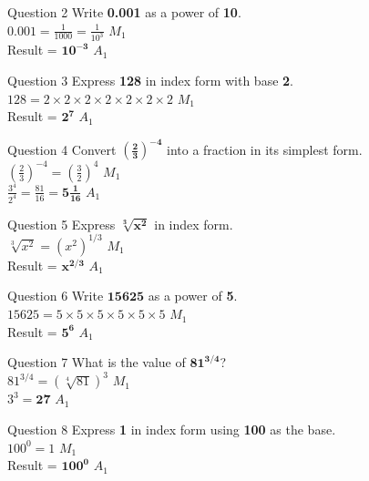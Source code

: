 \documentclass[12pt, a4paper, oneside]{article}
\begin{document}
\begin{solvingbox}{Question 2}
Write \textbf{0.001} as a power of \textbf{10}. \\
$0.001 = \frac{1}{1000} = \frac{1}{10^3}$ \hfill $M_1$ \\
Result = $\mathbf{10^{-3}}$ \hfill $A_1$
\end{solvingbox}

\begin{solvingbox}{Question 3}
Express \textbf{128} in index form with base \textbf{2}. \\
$128 = 2 \times 2 \times 2 \times 2 \times 2 \times 2 \times 2$ \hfill $M_1$ \\
Result = $\mathbf{2^7}$ \hfill $A_1$
\end{solvingbox}

\begin{solvingbox}{Question 4}
Convert $\mathbf{(\frac{2}{3})^{-4}}$ into a fraction in its simplest form. \\
$(\frac{2}{3})^{-4} = (\frac{3}{2})^4$ \hfill $M_1$ \\
$\frac{3^4}{2^4} = \frac{81}{16} = \mathbf{5\frac{1}{16}}$ \hfill $A_1$
\end{solvingbox}

\begin{solvingbox}{Question 5}
Express $\mathbf{\sqrt[3]{x^2}}$ in index form. \\
$\sqrt[3]{x^2} = (x^2)^{1/3}$ \hfill $M_1$ \\
Result = $\mathbf{x^{2/3}}$ \hfill $A_1$
\end{solvingbox}

\begin{solvingbox}{Question 6}
Write $\mathbf{15625}$ as a power of \textbf{5}. \\
$15625 = 5 \times 5 \times 5 \times 5 \times 5 \times 5$ \hfill $M_1$ \\
Result = $\mathbf{5^6}$ \hfill $A_1$
\end{solvingbox}

\begin{solvingbox}{Question 7}
What is the value of $\mathbf{81^{3/4}}$? \\
$81^{3/4} = (\sqrt[4]{81})^3$ \hfill $M_1$ \\
$3^3 = \mathbf{27}$ \hfill $A_1$
\end{solvingbox}

\begin{solvingbox}{Question 8}
Express \textbf{1} in index form using \textbf{100} as the base. \\
$100^0 = 1$ \hfill $M_1$ \\
Result = $\mathbf{100^0}$ \hfill $A_1$
\end{solvingbox}
\end{document}
